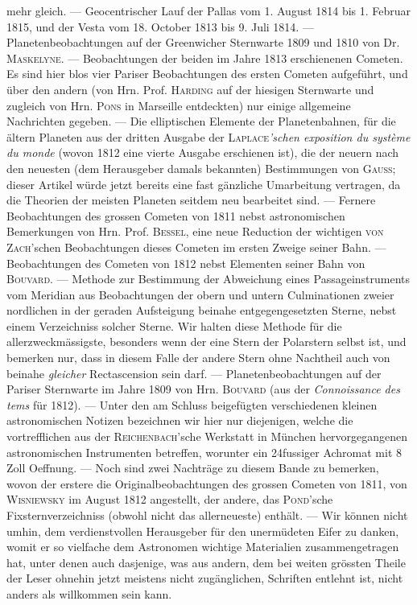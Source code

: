 mehr gleich. — Geocentrischer Lauf der Pallas vom 1. August 1814 bis 1. Februar 1815, und der Vesta vom 18. October 1813 bis 9. Juli 1814. — Planetenbeobachtungen auf der Greenwicher Sternwarte 1809 und 1810 von Dr. \textsc{Maskelyne}. — Beobachtungen der beiden im Jahre 1813 erschienenen Cometen. Es sind hier blos vier Pariser Beobachtungen des ersten Cometen aufgeführt, und über den andern (von Hrn. Prof. \textsc{Harding} auf der hiesigen Sternwarte und zugleich von Hrn. \textsc{Pons} in Marseille entdeckten) nur einige allgemeine Nachrichten gegeben. — Die elliptischen Elemente der Planetenbahnen, für die ältern Planeten aus der dritten Ausgabe der \textsc{Laplace}\emph{'schen exposition du système du monde} (wovon 1812 eine vierte Ausgabe erschienen ist), die der neuern nach den neuesten (dem Herausgeber damals bekannten) Bestimmungen von \textsc{Gauss}; dieser Artikel würde jetzt bereits eine fast gänzliche Umarbeitung vertragen, da die Theorien der meisten Planeten seitdem neu bearbeitet sind. — Fernere Beobachtungen des grossen Cometen von 1811 nebst astronomischen Bemerkungen von Hrn. Prof. \textsc{Bessel}, eine neue Reduction der wichtigen \textsc{von Zach}'schen Beobachtungen dieses Cometen im ersten Zweige seiner Bahn. — Beobachtungen des Cometen von 1812 nebst Elementen seiner Bahn von \textsc{Bouvard}. — Methode zur Bestimmung der Abweichung eines Passageinstruments vom Meridian aus Beobachtungen der obern und untern Culminationen zweier nordlichen in der geraden Aufsteigung beinahe entgegengesetzten Sterne, nebst einem Verzeichniss solcher Sterne. Wir halten diese Methode für die allerzweckmässigste, besonders wenn der eine Stern der Polarstern selbst ist, und bemerken nur, dass in diesem Falle der andere Stern ohne Nachtheil auch von beinahe \emph{gleicher} Rectascension sein darf. — Planetenbeobachtungen auf der Pariser Sternwarte im Jahre 1809 von Hrn. \textsc{Bouvard} (aus der \emph{Connoissance des tems} für 1812). — Unter den am Schluss beigefügten verschiedenen kleinen astronomischen Notizen bezeichnen wir hier nur diejenigen, welche die vortrefflichen aus der \textsc{Reichenbach}'sche Werkstatt in München hervorgegangenen astronomischen Instrumenten betreffen, worunter ein 24fussiger Achromat mit 8 Zoll Oeffnung. — Noch sind zwei Nachträge zu diesem Bande zu bemerken, wovon der erstere die Originalbeobachtungen des grossen Cometen von 1811, von \textsc{Wisniewsky} im August 1812 angestellt, der andere, das \textsc{Pond}'sche Fixsternverzeichniss (obwohl nicht das allerneueste) enthält. — Wir können nicht umhin, dem verdienstvollen Herausgeber für den unermüdeten Eifer zu danken, womit er so vielfache dem Astronomen wichtige Materialien zusammengetragen hat, unter denen auch dasjenige, was aus andern, dem bei weiten grössten Theile der Leser ohnehin jetzt meistens nicht zugänglichen, Schriften entlehnt ist, nicht anders als willkommen sein kann.
